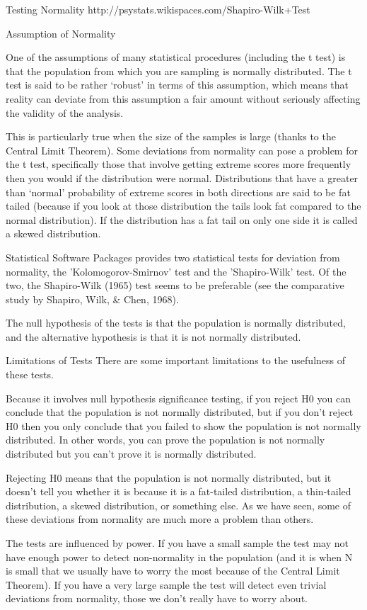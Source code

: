 Testing Normality
http://psystats.wikispaces.com/Shapiro-Wilk+Test


Assumption of Normality

One of the assumptions of many statistical procedures (including the t test) is that the population from which you are sampling is normally distributed. The t test is said to be rather ‘robust’ in terms of this assumption, which means that reality can deviate from this assumption a fair amount without seriously affecting the validity of the analysis. 

This is particularly true when the size of the samples is large (thanks to the Central Limit Theorem). Some deviations from normality can pose a problem for the t test, specifically those that involve getting extreme scores more frequently then you would if the distribution were normal. Distributions that have a greater than ‘normal’ probability of extreme scores in both directions are said to be fat tailed (because if you look at those distribution the tails look fat compared to the normal distribution). If the distribution has a fat tail on only one side it is called a skewed distribution. 
 
Statistical Software Packages provides two statistical tests for deviation from normality, the 'Kolomogorov-Smirnov' test and the 'Shapiro-Wilk' test. Of the two, the Shapiro-Wilk (1965) test seems to be preferable (see the comparative study by Shapiro, Wilk, & Chen, 1968). 

The null hypothesis of the tests is that the population is normally distributed, and the alternative hypothesis is that it is not normally distributed. 

Limitations of Tests
There are some important limitations to the usefulness of these tests.
 
Because it involves null hypothesis significance testing, if you reject H0 you can conclude that the population is not normally distributed, but if you don't reject H0 then you only conclude that you failed to show the population is not normally distributed. In other words, you can prove the population is not normally distributed but you can't prove it is normally distributed.
 
Rejecting H0 means that the population is not normally distributed, but it doesn't tell you whether it is because it is a fat-tailed distribution, a thin-tailed distribution, a skewed distribution, or something else. As we have seen, some of these deviations from normality are much more a problem than others.
 
The tests are influenced by power. If you have a small sample the test may not have enough power to detect non-normality in the population (and it is when N is small that we usually have to worry the most because of the Central Limit Theorem). If you have a very large sample the test will detect even trivial deviations from normality, those we don't really have to worry about.
 

